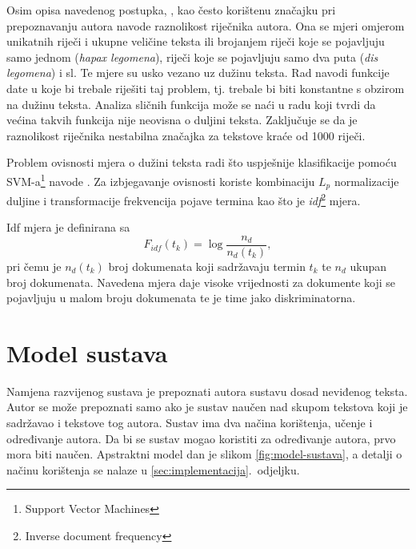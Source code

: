 \documentclass{article}
\begin{document}
Osim opisa navedenog postupka, \citet{stamatatos2001computer}, kao često
korištenu značajku pri prepoznavanju autora navode raznolikost riječnika autora.
Ona se mjeri omjerom unikatnih riječi i ukupne veličine teksta ili brojanjem
riječi koje se pojavljuju samo jednom (\emph{hapax legomena}), riječi koje se
pojavljuju samo dva puta (\emph{dis legomena}) i sl. Te mjere su usko vezano uz
dužinu teksta. Rad navodi funkcije date u
\citep{yule1944statistical,honore1979some} koje bi trebale riješiti taj problem,
tj. trebale bi biti konstantne s obzirom na dužinu teksta. Analiza sličnih
funkcija može se naći u radu \citep{tweedie1998variable} koji tvrdi da većina
takvih funkcija nije neovisna o duljini teksta. Zaključuje se da je raznolikost
riječnika nestabilna značajka za tekstove kraće od 1000 riječi.

Problem ovisnosti mjera o dužini teksta radi što uspješnije klasifikacije pomoću
SVM-a\footnote{Support Vector Machines} navode \citet{diederich2003authorship}.
Za izbjegavanje ovisnosti koriste kombinaciju $L_p$ normalizacije duljine i
transformacije frekvencija pojave termina kao što je
\emph{idf}\footnote{Inverse document frequency} mjera.

Idf mjera je definirana sa
\begin{equation}
F_{idf}(t_k) = \log \frac{n_d}{n_d(t_k)},
\label{equ:idf}
\end{equation}
pri čemu je $n_d(t_k)$ broj dokumenata koji sadržavaju termin $t_k$ te $n_d$
ukupan broj dokumenata. Navedena mjera daje visoke vrijednosti za dokumente koji
se pojavljuju u malom broju dokumenata te je time jako diskriminatorna. 


\section{Model sustava}
Namjena razvijenog sustava je prepoznati autora sustavu dosad neviđenog teksta.
Autor se može prepoznati samo ako je sustav naučen nad skupom tekstova koji je
sadržavao i tekstove tog autora. Sustav ima dva načina korištenja, učenje i
određivanje autora. Da bi se sustav mogao koristiti za određivanje autora, prvo
mora biti naučen. Apstraktni model dan je slikom \ref{fig:model-sustava}, a
detalji o načinu korištenja se nalaze u \ref{sec:implementacija}.~odjeljku.
\end{document}
